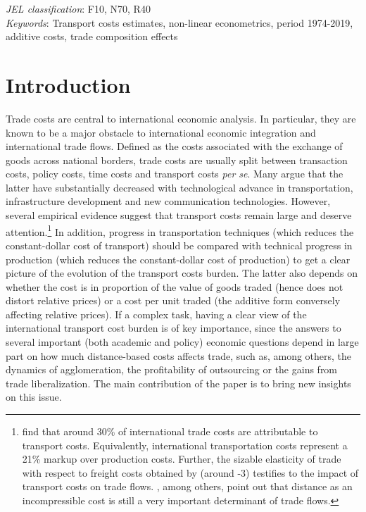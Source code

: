 \documentclass[a4paper,11pt]{article}
\begin{document}
\bigskip


\noindent \emph{JEL classification}: F10, N70, R40 \\
\noindent \emph{Keywords}: Transport costs estimates, non-linear econometrics, period 1974-2019, additive costs, trade composition effects

{\normalsize \vspace{0cm} }

{\normalsize \titlepage }

{\normalsize \newpage }


\section{Introduction \label{sec:Intro}}


Trade costs are central to international economic analysis. In particular, they are known to be a major obstacle to international economic integration and international trade flows. Defined as the costs associated with the exchange of goods across
national borders, trade costs are usually split between transaction costs, policy costs, time costs and transport costs \textit{per se}. Many argue that the latter have substantially decreased with technological advance in transportation, infrastructure development
and new communication technologies. However, several empirical evidence
suggest that transport costs remain large and deserve attention.\footnote{\cite{anderson_wincoop_jel} find that around 30\% of international trade costs are attributable to transport costs. Equivalently, international transportation costs represent a 21\% markup over production costs. Further, the sizable elasticity of trade with respect to freight costs obtained by \cite{Behar_Venables} (around -3) testifies to the impact of transport costs on trade flows. \cite{Disdier_Head08}, among others, point out that distance as an incompressible cost is still a very important determinant of trade flows.} In addition, progress in transportation techniques (which reduces the constant-dollar cost of transport) should be compared with technical progress in production (which reduces the constant-dollar cost of production) to get a clear picture of the evolution
of the transport costs burden. The latter also depends on whether the cost is in proportion of the value of goods traded (hence does not distort relative prices) or a cost per unit traded (the additive form conversely affecting relative prices). If a complex task, having a clear view of the international transport cost burden is of key importance, since the answers to several important (both academic and policy) economic questions depend in large part on how much distance-based costs affects trade, such as, among others, the dynamics
of agglomeration, the profitability of outsourcing or the gains from trade liberalization. The main contribution of the paper is to bring new insights on this issue.\smallskip
\end{document}
